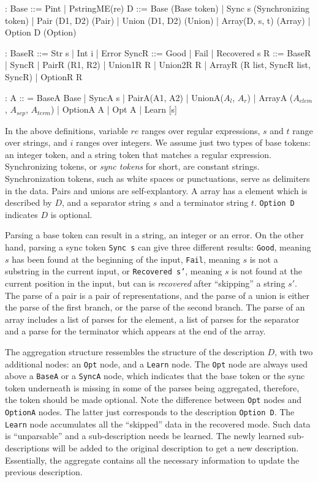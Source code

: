 \begin{code}
:
Base ::= Pint | PstringME(re)
D ::=   
  Base             (Base token)
| Sync s           (Synchronizing token) 
| Pair (D1, D2)    (Pair)
| Union (D1, D2)   (Union)
| Array(D, s, t)   (Array)
| Option D         (Option)

:
BaseR ::= Str s | Int i | Error
SyncR ::= Good | Fail | Recovered s 
R ::=
  BaseR
| SyncR
| PairR (R1, R2)
| Union1R R | Union2R R 
| ArrayR (R list, SyncR list, SyncR)
| OptionR R

\cdmath
{}:
A :: = 
  BaseA Base
| SyncA s
| PairA(A1, A2)
| UnionA($A_l$, $A_r$)
| ArrayA ($A_{elem}$, $A_{sep}$, $A_{term}$)
| OptionA A
| Opt A
| Learn [s]
\end{code}

In the above definitions, variable $re$ ranges over regular expressions,
$s$ and $t$ range over strings, and $i$ ranges over integers.
We assume just two types of base tokens: 
an integer token, and a string token that matches a
regular expression. Synchronizing tokens, or {\em sync tokens} for short, are constant strings. 
Synchronization tokens, such as white spaces or punctuations,
serve as delimiters in the data. Pairs and unions are self-explantory. 
A array has a element which is described by $D$, and a separator string $s$ and a
terminator string $t$. {\tt Option D} indicates $D$ is optional.

Parsing a base token can result in a string, an integer or an error.
On the other hand, parsing a sync token {\tt Sync s} can give three different results: 
{\tt Good}, meaning $s$ has been found at the beginning of the input, 
{\tt Fail}, meaning $s$ is not a substring in the current input, or 
{\tt Recovered s'}, meaning $s$ is not found at the current position in the input, but
can is {\em recovered} after ``skipping'' a string $s'$.
The parse of a pair is a pair of representations, and the
parse of a union is either the parse of the first branch, or the 
parse of the second branch. The parse of an array includes a list of parses for the element,
a list of parses for the separator and a parse for the terminator which appears at the end of
the array.

The aggregation structure ressembles the structure of the description $D$, 
with two additional nodes: an {\tt Opt} node, and a {\tt Learn} node. 
The {\tt Opt} node are always used above a {\tt BaseA} or a {\tt SyncA} node,
which indicates that the base token or the sync token underneath is missing in some of the parses
being aggregated, therefore, the token should be made optional.
Note the difference between {\tt Opt} nodes and {\tt OptionA} nodes. The latter 
just corresponds to the description {\tt Option D}. 
The {\tt Learn} node accumulates all the ``skipped'' data in the recovered mode. 
Such data is  ``unparsable'' and a sub-description needs be learned. The newly learned sub-descriptions 
will be added to the original description to get a new description. 
Essentially, the aggregate contains all the necessary information
to update the previous description.

